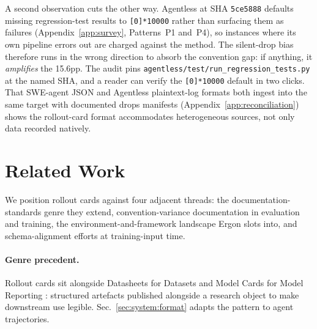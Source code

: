 \documentclass{article}
\begin{document}
A second observation cuts the other way. Agentless at SHA
\texttt{5ce5888} defaults missing regression-test results to
\texttt{[0]*10000} rather than surfacing them as failures
(Appendix~\ref{app:survey}, Patterns~P1 and~P4), so instances
where its own pipeline errors out are charged against the
method. The silent-drop bias therefore runs in the wrong
direction to absorb the convention gap: if anything, it
\emph{amplifies} the 15.6pp. The audit pins
\texttt{agentless/test/run\_regression\_tests.py} at the
named SHA, and a reader can verify the \texttt{[0]*10000}
default in two clicks. That SWE-agent JSON and Agentless
plaintext-log formats both ingest into the same target with
documented drops manifests (Appendix~\ref{app:reconciliation})
shows the rollout-card format accommodates heterogeneous
sources, not only data recorded natively.

\section{Related Work}
\label{sec:related}

We position rollout cards against four adjacent threads: the
documentation-standards genre they extend, convention-variance
documentation in evaluation and training, the
environment-and-framework landscape Ergon slots into, and
schema-alignment efforts at training-input time.

\paragraph{Genre precedent.} Rollout cards sit alongside
Datasheets for Datasets \citep{gebru2021datasheets} and Model
Cards for Model Reporting \citep{mitchell2019modelcards}:
structured artefacts published alongside a research object to
make downstream use legible. Sec.~\ref{sec:system:format}
adapts the pattern to agent trajectories.
\end{document}
